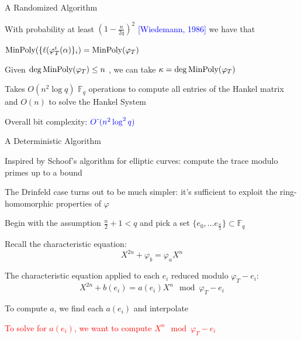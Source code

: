 \documentclass{beamer}
\newcommand{\f}{\mathbb{F}}
\newcommand{\blue}{\textcolor{blue}}
\newcommand{\red}{\textcolor{red}}
\newcommand{\red}{\textnormal{red}}
\begin{document}
\begin{frame}{A Randomized Algorithm}


    \item  With probability at least $(1 - \frac{n}{2q})^2$ \blue{[Wiedemann, 1986]} we have that \item \centerline{$\textnormal{MinPoly}(\{\ell(\varphi_T^i(\alpha)\}_i) = \textnormal{MinPoly}(\varphi_T)$}
    
    \item Given $\deg \textnormal{MinPoly}(\varphi_T) \leq n$ , we can take $\kappa = \deg \textnormal{MinPoly}(\varphi_T)$

        \item Takes $O(n^2 \log q)$ $\f_q$ operations to compute all entries of the Hankel matrix and $O(n)$ to solve the Hankel System
    \item Overall bit complexity: $\blue{O\tilde{~}(n^2 \log^2 q)}$

\end{frame}


\begin{frame}{A Deterministic Algorithm}


    \item Inspired by Schoof's algorithm for elliptic curves: compute the trace modulo primes up to a bound
    \item The Drinfeld case turns out to be much simpler: it's sufficient to exploit the ring-homomorphic properties of $\varphi$
    \item Begin with the assumption $ \frac{n}{2} + 1 < q$ and pick a set $\{e_0, \ldots e_{\frac{n}{2}}\} \subset \mathbb{F}_q$
    \item Recall the characteristic equation:
    \[X^{2n} + \varphi_b = \varphi_a X^n\]
    \item The characteristic equation applied to each $e_i$ reduced modulo $\varphi_{T} - e_i$:
    \[ X^{2n} + b(e_i) = a(e_i) X^n  \mod \varphi_{T} - e_i \]
    \item To compute $a$, we find each $a(e_i)$ and interpolate
    \item \red{To solve for $a(e_i)$, we want to compute $X^n \mod \varphi_{T} - e_i$}

    
\end{frame}
\end{document}
